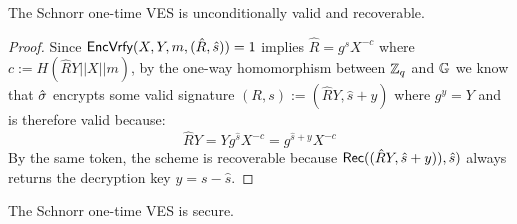 \begin{lemma}
The Schnorr one-time VES is unconditionally valid and recoverable.
\end{lemma}

\begin{proof}
 Since $\textsf{EncVrfy}(X,Y,m,(\hat{R},\hat{s})) = 1$ implies $ \hat{R} = g^{\hat{s}}X^{-c}$ where $c := H(\hat{R}Y || X || m)$, by the one-way homomorphism between $\mathbb{Z}_q$ and $\mathbb{G}$ we know that $\hat{\sigma}$ encrypts some valid signature $(R,s) := (\hat{R}Y, \hat{s} + y)$ where $g^y = Y$ and is therefore valid because:
\[ \hat{R}Y = Yg^{\hat{s}}X^{-c} = g^{\hat{s} + y}X^{-c} \]
By the same token, the scheme is recoverable because $\textsf{Rec}((\hat{R}Y, \hat{s} + y)), \hat{s})$ always returns the decryption key $y = s - \hat{s}$.
\end{proof}


\begin{theorem}
The Schnorr one-time VES is \EUFCMAVES secure.
\end{theorem}


